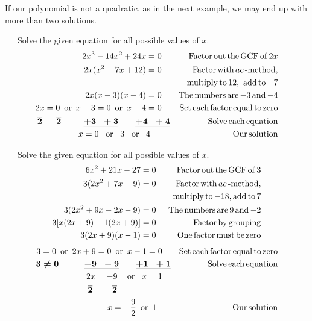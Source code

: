 If our polynomial is not a quadratic, as in the next example, we may end up with more than two solutions.\\

\begin{example}~~~Solve the given equation for all possible values of $x$.
  \begin{eqnarray*}
    2 x^3 - 14 x^2 + 24 x = 0~~~ &  & \operatorname{Factor} \operatorname{out} \operatorname{the}
    \operatorname{GCF} \operatorname{of} 2 x\\
    2 x (x^2 - 7 x + 12) = 0~~~ &  & \operatorname{Factor} \operatorname{with} ac
    \operatorname{-method},\\
		&& \operatorname{~~~multiply} \operatorname{to} 12, \operatorname{~add} \operatorname{to} - 7\\
    2 x (x - 3) (x - 4) = 0~~~ &  & \operatorname{The} \operatorname{numbers} \operatorname{are} - 3
    \operatorname{and} - 4\\
    2 x = 0 \operatorname{~or~} x - 3 = 0 \operatorname{~or~} x - 4 = 0~~~ &  & \operatorname{Set}
    \operatorname{each} \operatorname{factor} \operatorname{equal} \operatorname{to} \operatorname{zero}\\
    \boldsymbol{\overline{2} ~~~~~ \overline{2} ~~~~~~~~ \underline{+ 3 ~~+ 3} ~~~~~~ \underline{+ 4 ~~+ 4}} &  &
    \operatorname{Solve} \operatorname{each} \operatorname{equation}\\
    x = 0 \operatorname{~~or~~} 3 \operatorname{~~or~~} 4~~~~~~~ &  & \operatorname{Our} \operatorname{solution}
  \end{eqnarray*}
\end{example}

\begin{example}~~~Solve the given equation for all possible values of $x$.
  \begin{eqnarray*}
    6 x^2 + 21 x - 27 = 0 &  & \operatorname{Factor} \operatorname{out} \operatorname{the} \operatorname{GCF}
    \operatorname{of} 3\\
    3 (2 x^2 + 7 x - 9) = 0 &  & \operatorname{Factor} \operatorname{with} ac
    \operatorname{-method},\\
		&&\operatorname{~~~multiply} \operatorname{to} - 18, \operatorname{add} \operatorname{to} 7\\
    3 (2 x^2 + 9 x - 2 x - 9) = 0 &  & \operatorname{The} \operatorname{numbers} \operatorname{are} 9
    \operatorname{and} - 2\\
    3 [x (2 x + 9) - 1 (2 x + 9)] = 0 &  & \operatorname{Factor} \operatorname{by}
    \operatorname{grouping}\\
    3 (2 x + 9) (x - 1) = 0 &  & \operatorname{One} \operatorname{factor} \operatorname{must}
    \operatorname{be} \operatorname{zero}\\
  \end{eqnarray*}
	\begin{eqnarray*}
		3 = 0 \operatorname{~or~} 2 x + 9 = 0 \operatorname{~or~} x - 1 = 0~~~ &  & \operatorname{Set}
    \operatorname{each} \operatorname{factor} \operatorname{equal} \operatorname{to} \operatorname{zero}\\
    \boldsymbol{3 \neq 0 ~~~~~~~~~\underline{- 9 ~~- 9} ~~~~~~ \underline{+ 1 ~~+ 1}} &  & \operatorname{Solve}
    \operatorname{each} \operatorname{equation}\\
    2 x = - 9 \operatorname{~~~or~~} x = 1~~~ &  & \\
    \boldsymbol{\overline{2} ~~~~~~~ \overline{2}}~~~~~~~~~~~~~~~~~~~  &  & \\
    x = - \frac{9}{2} \operatorname{~or~} 1~~~~~ &  & \operatorname{Our} \operatorname{solution}
  \end{eqnarray*}
\end{example}


